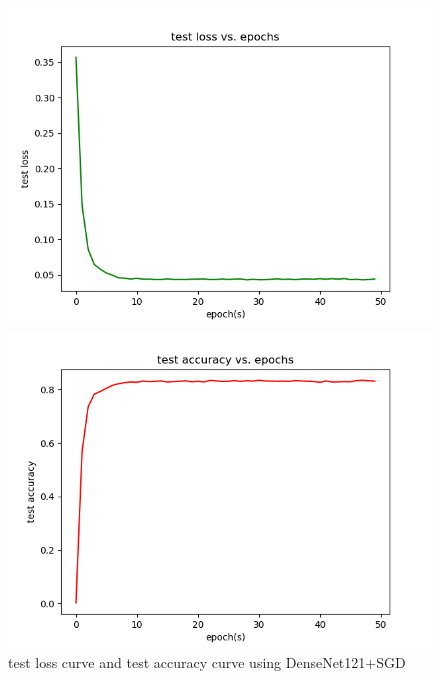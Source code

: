 \documentclass[cn]{elegantbook}
\begin{document}
\begin{figure}[!h]
	\centering
	\begin{minipage}[t]{0.48\textwidth}
		\centering
		\includegraphics[width=\textwidth]{../results/testloss_den}
	\end{minipage}
	\begin{minipage}[t]{0.48\textwidth}
		\centering
		\includegraphics[width=\textwidth]{../results/testacc_den}
	\end{minipage}
	\caption{\label{testres_den}test loss curve and test accuracy curve using DenseNet121+SGD}
\end{figure}
\end{document}

